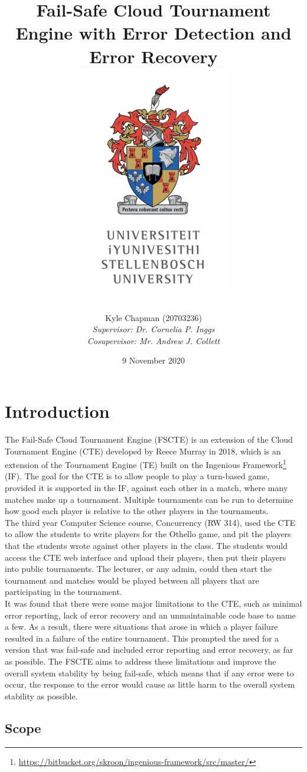 \documentclass[a4paper, 11pt]{report}
\title{
	{Fail-Safe Cloud Tournament Engine with Error Detection and Error Recovery} \\
	{\includegraphics[scale=1.4]{logo.png}}
}
\author{
	{Kyle Chapman (20703236)} \\
	{\emph{Supervisor: Dr. Cornelia P. Inggs}} \\
	{\emph{Cosupervisor: Mr. Andrew J. Collett}}
}
\date{9 November 2020}
\begin{document}
\maketitle
\tableofcontents

\chapter{Introduction}

The Fail-Safe Cloud Tournament Engine (FSCTE) is an extension of the Cloud
Tournament Engine (CTE) developed by Reece Murray in 2018, which is an extension
of the Tournament Engine (TE) built on the Ingenious Framework\footnote{\url{https://bitbucket.org/skroon/ingenious-framework/src/master/}}
(IF). The goal for the CTE is to allow people to play a turn-based game, provided
it is supported in the IF, against each other in a match, where many matches
make up a tournament. Multiple tournaments can be run to determine how good
each player is relative to the other players in the tournaments. \\

The third year Computer Science course, Concurrency (RW 314), used the CTE to
allow the students to write players for the Othello game, and pit the players
that the students wrote against other players in the class. The students would
access the CTE web interface and upload their players, then put their players
into public tournaments. The lecturer, or any admin, could then start the
tournament and matches would be played between all players that are participating
in the tournament. \\

It was found that there were some major limitations to the CTE, such as minimal
error reporting, lack of error recovery and an unmaintainable code base to name
a few. As a result, there were situations that arose in which a player failure
resulted in a failure of the entire tournament. This prompted the need for a
version that was fail-safe and included error reporting and error recovery, as
far as possible. The FSCTE aims to address these limitations and improve the
overall system stability by being fail-safe, which means that if any error were
to occur, the response to the error would cause as little harm to the overall
system stability as possible.

\section{Scope}
\end{document}

